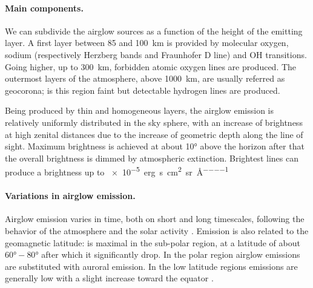 \documentclass[a4paper, titlepage, 10pt]{book}
\begin{document}
\paragraph{Main components.} We can subdivide the airglow sources as a function of the height of the emitting layer. A first layer between 85 and \SI{100}{km} is provided by molecular oxygen, sodium (respectively Herzberg  bands and Fraunhofer D line) and OH transitions. Going higher, up to \SI{300}{km}, forbidden atomic oxygen lines are produced. The outermost layers of the atmosphere, above \SI{1000}{km}, are usually referred as geocorona; is this region faint but detectable hydrogen lines are produced.

Being produced by thin and homogeneous layers, the airglow emission is relatively uniformly distributed in the sky sphere, with an increase of brightness at high zenital distances due to the increase of geometric depth along the line of sight. Maximum brightness is achieved at about \ang{10} above the horizon after that the overall brightness is dimmed by atmospheric extinction. Brightest lines can produce a brightness up to \SI{e-5}{erg\per\second \per\centi\metre\squared \per\steradian\per\angstrom}

\paragraph{Variations in airglow emission.} Airglow emission varies in time, both on short and long timescales, following the behavior of the atmosphere and the solar activity \cite{leinert19981997}. Emission is also related to the geomagnetic latitude: is maximal in the sub-polar region, at a latitude of about $\ang{60}-\ang{80}$ after which it significantly drop. In the polar region airglow emissions are substituted with auroral emission. In the low latitude regions emissions are generally low with a slight increase toward the equator \cite{eather1969latitudinal}.
\end{document}

